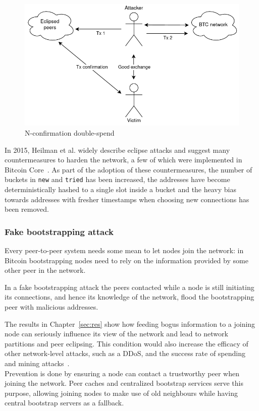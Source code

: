 \documentclass[12pt, letterpaper, twoside]{article}
\begin{document}
\begin{figure}[h!]
	\includegraphics[width=.75\textwidth]{pict/nconfirm-doublespend.png}
	\centering
	\caption{N-confirmation double-spend}
	\label{fig:nconfirm}
\end{figure}

In 2015, Heilman et al. widely describe eclipse attacks and suggest many countermeasures to harden the network, a few of which were implemented in Bitcoin Core~\cite{eclipseatk}. As part of the adoption of these countermeasures, the number of buckets in \texttt{new} and \texttt{tried} has been increased, the addresses have become deterministically hashed to a single slot inside a bucket and the heavy bias towards addresses with fresher timestamps when choosing new connections has been removed.


\subsubsection{Fake bootstrapping attack}\label{sec:fakeboot}
Every peer-to-peer system needs some mean to let nodes join the network: in Bitcoin bootstrapping nodes need to rely on the information provided by some other peer in the network.

In a fake bootstrapping attack the peers contacted while a node is still initiating its connections, and hence its knowledge of the network, flood the bootstrapping peer with malicious addresses.

The results in Chapter~\ref{sec:res} show how feeding bogus information to a joining node can seriously influence its view of the network and lead to network partitions and peer eclipsing. This condition would also increase the efficacy of other network-level attacks, such as a DDoS, and the success rate of spending and mining attacks~\cite{eclipseatk}.\\

Prevention is done by ensuring a node can contact a trustworthy peer when joining the network. Peer caches and centralized bootstrap services serve this purpose, allowing joining nodes to make use of old neighbours while having central bootstrap servers as a fallback.
\end{document}
